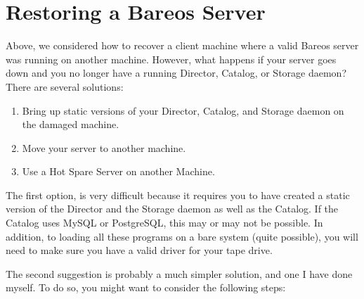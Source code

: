 \section{Restoring a Bareos Server}
\label{sec:RestoreServer}

Above, we considered how to recover a client machine where a valid Bareos
server was running on another machine. However, what happens if your server
goes down and you no longer have a running Director, Catalog, or Storage
daemon? There are several solutions:

\begin{enumerate}
\item Bring up static versions of your Director, Catalog, and Storage  daemon
   on the damaged machine.

\item Move your server to another machine.

\item Use a Hot Spare Server on another Machine.
\end{enumerate}

The first option, is very difficult because it requires you to have created a
static version of the Director and the Storage daemon as well as the Catalog.
If the Catalog uses MySQL or PostgreSQL, this may or may not be possible. In
addition, to loading all these programs on a bare system (quite possible), you
will need to make sure you have a valid driver for your tape drive.

The second suggestion is probably a much simpler solution, and one I have done
myself. To do so, you might want to consider the following steps:

